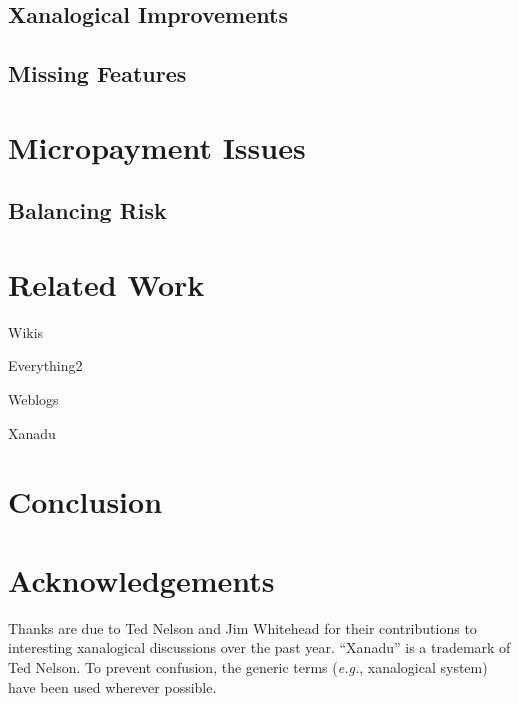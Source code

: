 \documentclass{acm_proc_article-sp}
\begin{document}
\subsection{Xanalogical Improvements}


\subsection{Missing Features}



\section{Micropayment Issues}


\subsection{Balancing Risk}



\section{Related Work}
\label{sec:RelatedWork}

Wikis
\cite{WikiWikiWeb}
\cite{Wikipedia}

Everything2
\cite{Everything2}

Weblogs
\cite{kuro5hin}

Xanadu

\section{Conclusion}


\section{Acknowledgements}
Thanks are due to Ted Nelson and Jim Whitehead for their contributions to interesting xanalogical discussions over the past year. ``Xanadu'' is a trademark of Ted Nelson.  To prevent confusion, the generic terms ({\it e.g.}, xanalogical system) have been used wherever possible.



\end{document}
